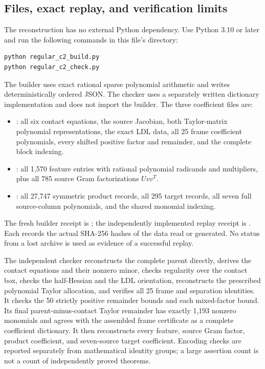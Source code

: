 \subsection{Files, exact replay, and verification limits}

The reconstruction has no external Python dependency. Use Python 3.10 or
later and run the following commands in this file's directory:
\begin{verbatim}
python regular_c2_build.py
python regular_c2_check.py
\end{verbatim}
The builder uses exact rational sparse polynomial arithmetic and writes
deterministically ordered JSON. The checker uses a separately written
dictionary implementation and does not import the builder. The three
coefficient files are:
\begin{itemize}
 \item {}: all six contact equations, the source
 Jacobian, both Taylor-matrix polynomial representations, the exact LDL data,
 all 25 frame coefficient polynomials, every shifted positive factor and
 remainder, and the complete block indexing.
 \item {}: all 1,570 feature entries with
 rational polynomial radicands and multipliers, plus all 785 source Gram
 factorizations $Uvv^T$.
 \item {}: all 27,747 symmetric product
 records, all 295 target records, all seven full source-column polynomials,
 and the shared monomial indexing.
\end{itemize}
The fresh builder receipt is
; the independently implemented replay
receipt is . Each records the
actual SHA-256 hashes of the data read or generated. No status from a lost
archive is used as evidence of a successful replay.

The independent checker reconstructs the complete parent directly, derives
the contact equations and their nonzero minor, checks regularity over the
contact box, checks the half-Hessian and the LDL orientation, reconstructs
the prescribed polynomial Taylor allocation, and verifies all 25 frame and
separation identities. It checks the 50 strictly positive remainder bounds
and each mixed-factor bound. Its final parent-minus-contact Taylor remainder
has exactly 1,193 nonzero monomials and agrees with the assembled frame
certificate as a complete coefficient dictionary. It then reconstructs every
feature, source Gram factor, product coefficient, and seven-source target
coefficient. Encoding checks are reported separately from mathematical identity
groups; a large assertion count is not a count of independently proved
theorems.

